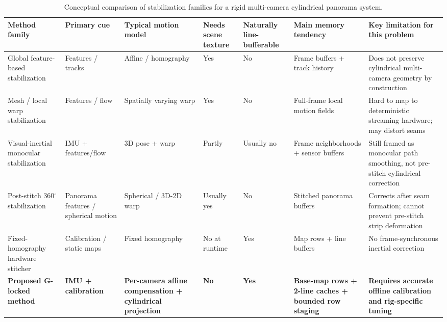 \documentclass[journal]{IEEEtran}
\begin{document}
\begin{table}[t]
\caption{Conceptual comparison of stabilization families for a rigid multi-camera cylindrical panorama system.}
\label{tab:comparisonfamilies}
\centering
\footnotesize
\begin{tabularx}{\textwidth}{@{}p{2.6cm}p{2.0cm}p{2.3cm}p{1.8cm}p{1.7cm}p{2.0cm}Y@{}}
\toprule
Method family & Primary cue & Typical motion model & Needs scene texture & Naturally line-bufferable & Main memory tendency & Key limitation for this problem \\
\midrule
Global feature-based stabilization & Features / tracks & Affine / homography & Yes & No & Frame buffers + track history & Does not preserve cylindrical multi-camera geometry by construction \\
Mesh / local warp stabilization & Features / flow & Spatially varying warp & Yes & No & Full-frame local motion fields & Hard to map to deterministic streaming hardware; may distort seams \\
Visual-inertial monocular stabilization & IMU + features/flow & 3D pose + warp & Partly & Usually no & Frame neighborhoods + sensor buffers & Still framed as monocular path smoothing, not pre-stitch cylindrical correction \\
Post-stitch 360$^\circ$ stabilization & Panorama features / spherical motion & Spherical / 3D-2D warp & Usually yes & No & Stitched panorama buffers & Corrects after seam formation; cannot prevent pre-stitch strip deformation \\
Fixed-homography hardware stitcher & Calibration / static maps & Fixed homography & No at runtime & Yes & Map rows + line buffers & No frame-synchronous inertial correction \\
\textbf{Proposed G-locked method} & \textbf{IMU + calibration} & \textbf{Per-camera affine compensation + cylindrical projection} & \textbf{No} & \textbf{Yes} & \textbf{Base-map rows + 2-line caches + bounded row staging} & \textbf{Requires accurate offline calibration and rig-specific tuning} \\
\bottomrule
\end{tabularx}
\end{table}
\end{document}
